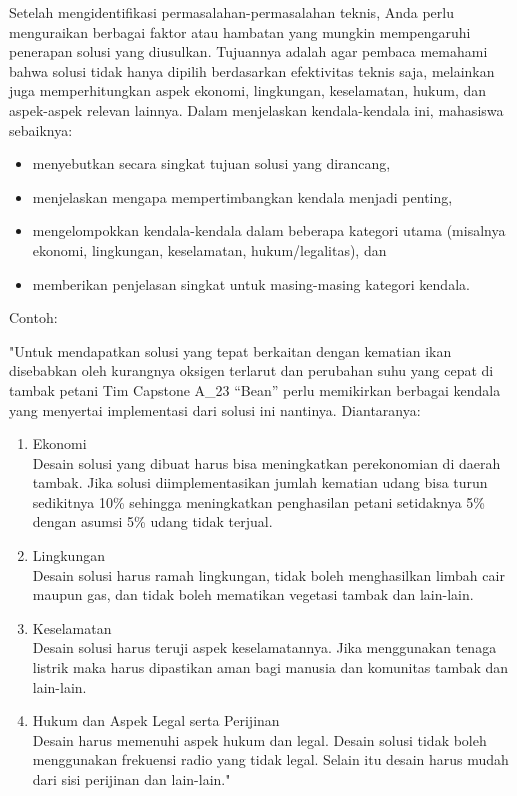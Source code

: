     Setelah mengidentifikasi permasalahan-permasalahan teknis, Anda perlu menguraikan berbagai faktor atau hambatan yang mungkin mempengaruhi penerapan solusi yang diusulkan. Tujuannya adalah agar pembaca memahami bahwa solusi tidak hanya dipilih berdasarkan efektivitas teknis saja, melainkan juga memperhitungkan aspek ekonomi, lingkungan, keselamatan, hukum, dan aspek-aspek relevan lainnya. Dalam menjelaskan kendala-kendala ini, mahasiswa sebaiknya:
    \begin{itemize}
        \item menyebutkan secara singkat tujuan solusi yang dirancang,
        \item menjelaskan mengapa mempertimbangkan kendala menjadi penting,
        \item mengelompokkan kendala-kendala dalam beberapa kategori utama (misalnya ekonomi, lingkungan, keselamatan, hukum/legalitas), dan
        \item memberikan penjelasan singkat untuk masing-masing kategori kendala.
    \end{itemize}
    \vspace{6pt}
    
    \noindent
    Contoh:
    
    "Untuk mendapatkan solusi yang tepat berkaitan dengan kematian ikan disebabkan oleh kurangnya oksigen terlarut dan perubahan suhu yang cepat di tambak petani Tim Capstone A\_23 “Bean” perlu memikirkan berbagai kendala yang menyertai implementasi dari solusi ini nantinya. Diantaranya:
    \begin{enumerate}[label=\alph*.]
        \item Ekonomi\\
        Desain solusi yang dibuat harus bisa meningkatkan perekonomian di daerah tambak. Jika solusi diimplementasikan jumlah kematian udang bisa turun sedikitnya 10\% sehingga meningkatkan penghasilan petani setidaknya 5\% dengan asumsi 5\% udang tidak terjual.
        \item Lingkungan\\ 
        Desain solusi harus ramah lingkungan, tidak boleh menghasilkan limbah cair maupun gas, dan tidak boleh mematikan vegetasi tambak dan lain-lain.
        \item Keselamatan\\
        Desain solusi harus teruji aspek keselamatannya. Jika menggunakan tenaga listrik maka harus dipastikan aman bagi manusia dan komunitas tambak dan lain-lain.
        \item Hukum dan Aspek Legal serta Perijinan\\
        Desain harus memenuhi aspek hukum dan legal. Desain solusi tidak boleh menggunakan frekuensi radio yang tidak legal. Selain itu desain harus mudah dari sisi perijinan dan lain-lain."
    \end{enumerate}

